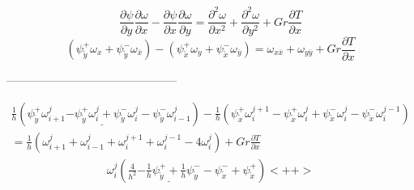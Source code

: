 \documentclass[a4paper]{article}
\newcommand{\der}[2]{\frac{\partial {#1}}{\partial {#2}}}
\newcommand{\dder}[2]{\frac{\partial^2 {#1}}{\partial {#2}^2}}
\newcommand{\psp}[2]{\psi_{\mathring{#1}}^{#2}}
\newcommand{\om}[2]{\omega_{i#1}^{j#2}}
\begin{document}
\begin{equation}
    \der{\psi}{y}\der{\omega}{x} - \der{\psi}{x}\der{\omega}{y}
    = \dder{\omega}{x} + \dder{\omega}{y} + Gr \der{T}{x}
\end{equation}
\begin{equation}
    (\psp{y}{+} \omega_{x} + \psp{y}{-} \omega_{\overline{x}})
  - (\psp{x}{+} \omega_{y} + \psp{x}{-} \omega_{\overline{y}})
  = \omega_{x\overline{x}} + \omega_{y\overline{y}} + Gr \der{T}{x}
\end{equation}

\begin{center}---------------------------------------------\end{center}

\begin{equation}
\begin{gathered}
    \frac{1}{h}(\psp{y}{+} \om{+1}{} \underline{- \psp{y}{+} \om{}{} 
    + \psp{y}{-} \om{}{}} - \psp{y}{-} \om{-1}{})
    -\frac{1}{h}(\psp{x}{+} \om{}{+1} - \psp{x}{+} \om{}{} 
    + \psp{x}{-} \om{}{} - \psp{x}{-} \om{}{-1}) \\
    = \frac{1}{h}\left( \om{+1}{} + \om{-1}{} + \om{}{+1} + \om{}{-1} -4\om{}{} \right) + Gr \der{T}{x}
\end{gathered}
\end{equation}
\begin{equation}
\begin{gathered}
    \om{}{} \left( \frac{4}{h^2} 
    \underline{- \frac{1}{h}\psp{y}{+} + \frac{1}{h}\psp{y}{-}} 
  - \psp{x}{-} + \psp{x}{+}
    \right)<++>
\end{gathered}
\end{equation}
\end{document}
